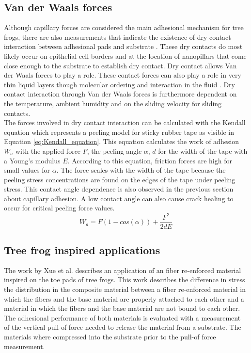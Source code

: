 \subsection{Van der Waals forces}
\qquad Although capillary forces are considered the main adhesional mechanism for tree frogs, there are also measurements that indicate the existence of dry contact interaction between adhesional pads and substrate \cite{kappl2016nanoscale}. These dry contacts do most likely occur on epithelial cell borders and at the location of nanopillars that come close enough to the substrate to establish dry contact. Dry contact allows Van der Waals forces to play a role. These contact forces can also play a role in very thin liquid layers though molecular ordering and interaction in the fluid \cite{federle2004biomechanics}. Dry contact interaction through Van der Waals forces is furthermore dependent on the temperature, ambient humidity and on the sliding velocity for sliding contacts.\\ 

\qquad The forces involved in dry contact interaction can be calculated with the Kendall equation which represents a peeling model for sticky rubber tape as visible in Equation \ref{eq:Kendall_equation}. This equation calculates the work of adhesion $W_a$ with the applied force $F$, the peeling angle $\alpha$, $d$ for the width of the tape with a Young's modulus $E$. According to this equation, friction forces are high for small values for $\alpha$. The force scales with the width of the tape because the peeling stress concentrations are found on the edges of the tape under peeling stress. This contact angle dependence is also observed in the previous section about capillary adhesion. A low contact angle can also cause crack healing to occur for critical peeling force values.\\
\begin{equation}
    W_a = F(1-cos(\alpha)) + \frac{F^2}{2dE}
    \label{eq:Kendall_equation}
\end{equation}

\subsection{Tree frog inspired applications}\label{sec:tree_frog_applications}
\qquad The work by Xue et al. describes an application of an fiber re-enforced material inspired on the toe pads of tree frogs. This work describes the difference in stress the distribution in the composite material between a fiber re-enforced material in which the fibers and the base material are properly attached to each other and a material in which the fibers and the base material are not bound to each other. The adhesional performance of both materials is evaluated with a measurement of the vertical pull-of force needed to release the material from a substrate. The materials where compressed into the substrate prior to the pull-of force measurement.\\

